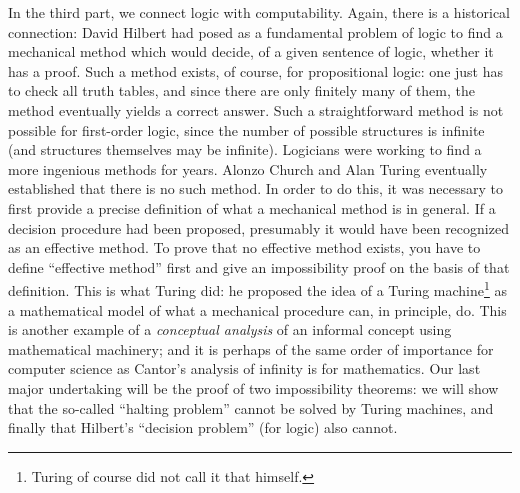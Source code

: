 In the third part, we connect logic with computability.  Again, there
is a historical connection: David Hilbert had posed as a fundamental
problem of logic to find a mechanical method which would decide, of a
given sentence of logic, whether it has a proof. Such a method exists,
of course, for propositional logic: one just has to check all truth
tables, and since there are only finitely many of them, the method
eventually yields a correct answer.  Such a straightforward method is
not possible for first-order logic, since the number of possible
structures is infinite (and structures themselves may be
infinite). Logicians were working to find a more ingenious methods for
years.  Alonzo Church and Alan Turing eventually established that
there is no such method.  In order to do this, it was necessary to
first provide a precise definition of what a mechanical method is in
general. If a decision procedure had been proposed, presumably it
would have been recognized as an effective method. To prove that no
effective method exists, you have to define ``effective method'' first
and give an impossibility proof on the basis of that definition.  This
is what Turing did: he proposed the idea of a Turing
machine\footnote{Turing of course did not call it that himself.} as a
mathematical model of what a mechanical procedure can, in principle,
do.  This is another example of a \emph{conceptual analysis} of an
informal concept using mathematical machinery; and it is perhaps of
the same order of importance for computer science as Cantor's analysis
of infinity is for mathematics.  Our last major undertaking will be
the proof of two impossibility theorems: we will show that the
so-called ``halting problem'' cannot be solved by Turing machines, and
finally that Hilbert's ``decision problem'' (for logic) also cannot.

